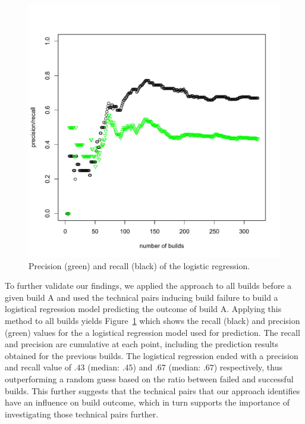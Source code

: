 \documentclass[conference]{IEEEtran}
\begin{document}
\begin{figure}[t]
\vspace{-29pt}
\centering
\includegraphics[width=\columnwidth]{precision-recall-logreg}
\vspace{-25pt}
\caption{Precision (green) and recall (black) of the logistic regression.}
\label{fig:prediction}
\end{figure}

To further validate our findings, we applied the approach to all builds before a given build A and used the technical pairs inducing build failure to build a logistical regression model predicting the outcome of build A.
Applying this method to all builds yields Figure~\ref{fig:prediction} which shows the recall (black) and precision (green) values for the a logistical regression model used for prediction.
The recall and precision are cumulative at each point, including the prediction results obtained for the previous builds.
The logistical regression ended with a precision and recall value of $.43$ (median: $.45$) and $.67$ (median: $.67$) respectively, thus outperforming a random guess based on the ratio between failed and successful builds.
This further suggests that the technical pairs that our approach identifies have an influence on build outcome, which in turn supports the importance of investigating those technical pairs further.
\end{document}
